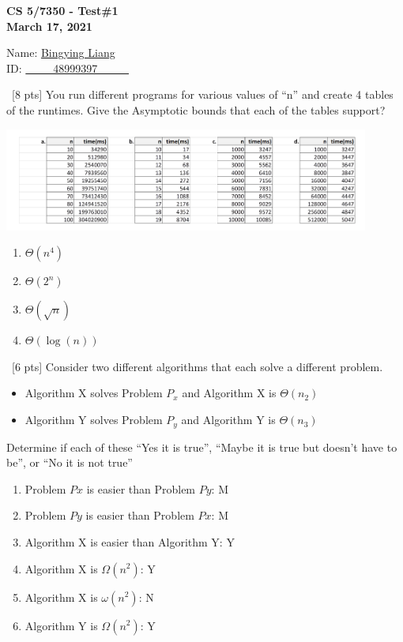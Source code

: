 \documentclass[12pt]{article}
\newenvironment{sol}[1][Solution]{\begin{trivlist}\item[\hskip\labelsep {\bfseries #1:}]}{\end{trivlist}}
\begin{document}
\renewcommand{\qedsymbol}{\filledbox}
\begin{center}
    \textbf{CS 5/7350 - Test\#1} \\
    \textbf{March 17, 2021}
\end{center}
\begin{flushright}
Name: \underline{Bingying Liang }\\
ID:  \underline{\ \ \ \ \ 48999397 \ \ \ \ \ }
\end{flushright}

\begin{enumerate}
    \item \ [8 pts] You run different programs for various values of “n” and create 4 tables of the runtimes. Give the Asymptotic bounds that each of the tables support?
     \begin{center}
            \includegraphics[width = 0.9\textwidth]{p1.png}
    \end{center}
    \begin{sol}
    \begin{enumerate}
        \item $\Theta(n^4)$
        \item $\Theta(2^n)$
        \item $\Theta(\sqrt{n})$
        \item $\Theta(\log(n))$
    \end{enumerate}
    \end{sol}

    \item \ [6 pts] Consider two different algorithms that each solve a different problem.
    \begin{itemize}
        \item Algorithm X solves Problem $P_x$ and Algorithm X is $\Theta(n_2)$
        \item Algorithm Y solves Problem $P_y$ and Algorithm Y is $\Theta(n_3)$
    \end{itemize}
    Determine if each of these “Yes it is true”, “Maybe it is true but doesn’t have to be”, or “No it is not true”
    \begin{enumerate}
        \item Problem $Px$ is easier than Problem $Py$: M
        \item Problem $Py$ is easier than Problem $Px$: M
        \item Algorithm X is easier than Algorithm Y: Y
        \item Algorithm X is $\Omega(n^2)$: Y
        \item Algorithm X is $\omega(n^2)$: N
        \item Algorithm Y is $\Omega(n^2)$: Y
    \end{enumerate}


\end{enumerate}
\end{document}
